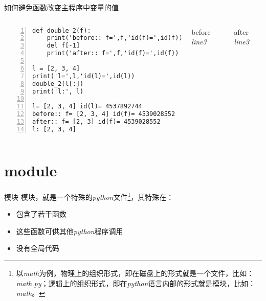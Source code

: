 \documentclass{beamer}
\begin{document}
\begin{frame}[fragile]{如何避免函数改变主程序中变量的值}
\begin{columns}
\begin{Verbatim}[numbers=left,frame=single,rulecolor=\color{red}]
def double_2(f):
    print('before:: f=',f,'id(f)=',id(f))
    del f[-1]
    print('after:: f=',f,'id(f)=',id(f))

l = [2, 3, 4]
print('l=',l,'id(l)=',id(l))
double_2(l[:])
print('l:', l)

l= [2, 3, 4] id(l)= 4537892744
before:: f= [2, 3, 4] id(f)= 4539028552
after:: f= [2, 3] id(f)= 4539028552
l: [2, 3, 4]
\end{Verbatim}
\begin{block}{before \textit{line3}}
\end{block}
\begin{block}{after \textit{line3}}
\end{block}

\end{columns}
\end{frame}
\section{module}
\begin{frame}[fragile]{模块}
模块，就是一个特殊的\textit{python}文件\footnote{以\textit{math}为例，物理上的组织形式，即在磁盘上的形式就是一个文件，比如：\textit{math.py}；逻辑上的组织形式，即在\textit{python}语言内部的形式就是模块，比如：\textit{math}。}，其特殊在：
\begin{itemize}
\item 包含了若干函数
\item 这些函数可供其他\textit{python}程序调用
\item 没有全局代码
\end{itemize}

\end{frame}
\end{document}
